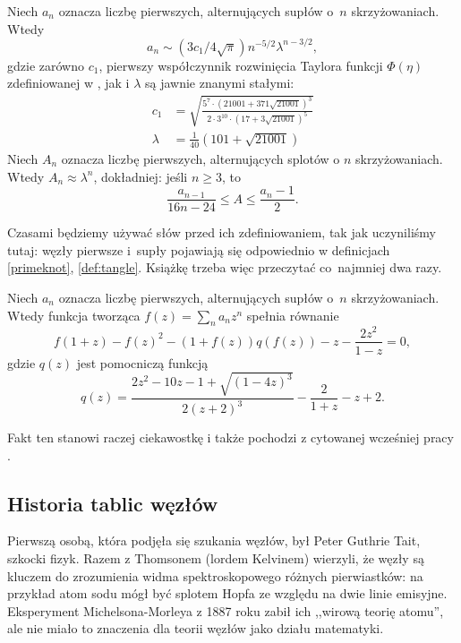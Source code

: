{\begin{proposition}
    Niech $a_n$ oznacza liczbę pierwszych, alternujących supłów o~$n$ skrzyżowaniach.
    Wtedy
    \begin{equation}
        a_n \sim (3c_1/4\sqrt{\pi})n^{-5/2}\lambda^{n-3/2},
    \end{equation}
    gdzie zarówno $c_1$, pierwszy współczynnik rozwinięcia Taylora funkcji $\Phi(\eta)$ zdefiniowanej w \cite{sundberg98}, jak i $\lambda$ są jawnie znanymi stałymi:
    \begin{align}
        c_1 & = \sqrt{\frac{5^7 \cdot (21001 + 371 \sqrt{21001})^3}{2 \cdot 3^{10} \cdot (17 + 3\sqrt{21001})^5}} \\
        \lambda & = \frac {1}{40} (101 + \sqrt{21001})
    \end{align}
    Niech $A_n$ oznacza liczbę pierwszych, alternujących splotów o $n$ skrzyżowaniach.
    Wtedy $A_n \approx \lambda^n$, dokładniej: jeśli $n \ge 3$, to
    \begin{equation}
        \frac{a_{n-1}}{16n - 24} \le A \le \frac{a_n - 1}{2}.
    \end{equation}
\end{proposition}

Czasami będziemy używać słów przed ich zdefiniowaniem, tak jak uczyniliśmy tutaj: węzły pierwsze i~supły pojawiają się odpowiednio w definicjach \ref{primeknot}, \ref{def:tangle}.
Książkę trzeba więc przeczytać co~najmniej dwa razy.

\begin{proposition}
    Niech $a_n$ oznacza liczbę pierwszych, alternujących supłów o~$n$ skrzyżowaniach.
    Wtedy funkcja tworząca $f(z) = \sum_n a_n z^n$ spełnia równanie
    \begin{equation}
    f(1+z) - f(z)^2 - (1+f(z))q(f(z)) -z - \frac{2z^2}{1-z} = 0,
    \end{equation}
    gdzie $q(z)$ jest pomocniczą funkcją
    \begin{equation}
        q(z) = \frac{2z^2 - 10z - 1 + \sqrt{(1-4z)^3}} {2(z+2)^3} - \frac{2}{1+z} -z + 2.
    \end{equation}
\end{proposition}

Fakt ten stanowi raczej ciekawostkę i także pochodzi z cytowanej wcześniej pracy \cite{sundberg98}.

\subsection{Historia tablic węzłów}
Pierwszą osobą, która podjęła się szukania węzłów, był Peter Guthrie Tait, szkocki fizyk.
Razem z Thomsonem (lordem Kelvinem) wierzyli, że węzły są kluczem do zrozumienia widma spektroskopowego różnych pierwiastków: na przykład atom sodu mógł być splotem Hopfa ze względu na dwie linie emisyjne.
Eksperyment Michelsona-Morleya z 1887 roku zabił ich ,,wirową teorię atomu'', ale nie miało to znaczenia dla teorii węzłów jako działu matematyki.

}
